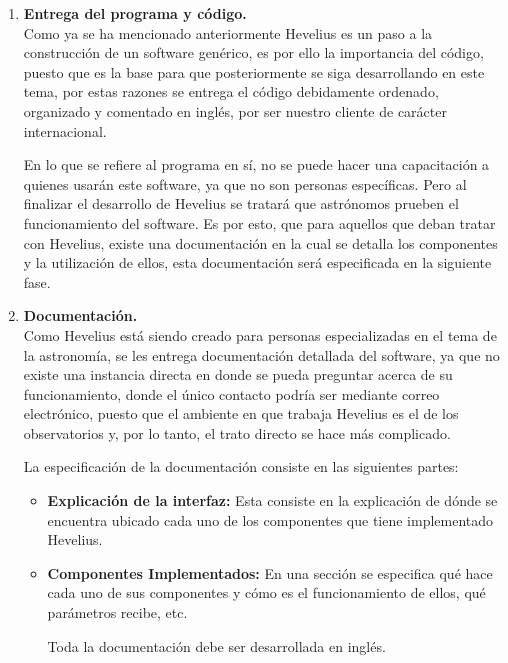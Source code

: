 \documentclass[letterpaper,spanish,10pt]{article}
\begin{document}
\begin{enumerate}
	\item {\bf{Entrega del programa y c\'odigo.}}\\
Como ya se ha mencionado anteriormente Hevelius es un paso a la construcci\'on 
de un software gen\'erico, es por ello la importancia del c\'odigo, puesto que 
es la base para que posteriormente se siga desarrollando en este tema, por 
estas razones se entrega el c\'odigo debidamente ordenado, organizado y 
comentado en ingl\'es, por ser nuestro cliente de car\'acter internacional.

En lo que se refiere al programa en s\'i, no se puede hacer una capacitaci\'on 
a quienes usar\'an este software, ya que no son personas espec\'ificas. Pero al 
finalizar el desarrollo de Hevelius se tratar\'a que astr\'onomos prueben el 
funcionamiento del software. Es por esto, que para aquellos que deban tratar 
con Hevelius, existe una documentaci\'on en la cual se detalla los componentes 
y la utilizaci\'on de ellos, esta documentaci\'on ser\'a especificada en la 
siguiente fase.\\

	\item{\bf{Documentaci\'on.}}\\
Como Hevelius est\'a siendo creado para personas especializadas en el tema de 
la astronom\'ia, se les entrega documentaci\'on detallada del software, ya que 
no existe una instancia directa en donde se pueda preguntar acerca de su 
funcionamiento, donde el \'unico contacto podr\'ia ser mediante correo 
electr\'onico, puesto que el ambiente en que trabaja Hevelius es el de los 
observatorios y, por lo tanto, el trato directo se hace m\'as complicado.

La especificaci\'on de la documentaci\'on consiste en las siguientes partes:

\begin{itemize}
	\item {\bf{Explicaci\'on de la interfaz:}} Esta consiste en la 
explicaci\'on de d\'onde se encuentra ubicado cada uno de los componentes que 
tiene implementado Hevelius.
	\item{ \bf{Componentes Implementados:}} En una secci\'on se especifica 
qu\'e hace cada uno de sus componentes y c\'omo es el funcionamiento de ellos, 
qu\'e par\'ametros recibe, etc.

Toda la documentaci\'on debe ser desarrollada en ingl\'es.
\end{itemize}
\end{enumerate}
\end{document}

